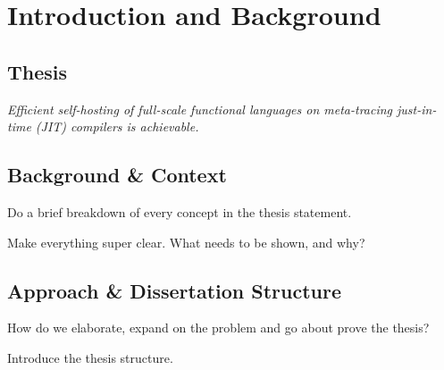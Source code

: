 \chapter{Introduction and Background}

\section{Thesis}

\textit{Efficient self-hosting of full-scale functional languages on meta-tracing just-in-time (JIT) compilers is achievable.}


\section{Background \& Context}

\begin{mainpoint}

Do a brief breakdown of every concept in the thesis statement.

Make everything super clear. What needs to be shown, and why?


\end{mainpoint}

\section{Approach \& Dissertation Structure}

\begin{mainpoint}

How do we elaborate, expand on the problem and go about prove the thesis?

Introduce the thesis structure.
\end{mainpoint}







